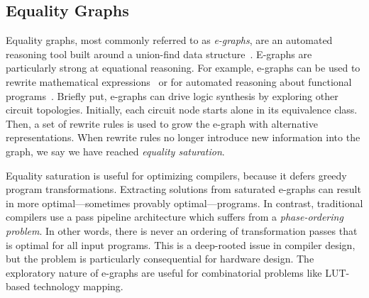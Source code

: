 \subsection{Equality Graphs}\label{sec:background:egraph}
Equality graphs, most commonly referred to as \textit{e-graphs}, are an
automated reasoning tool built around a union-find data
structure~\cite{eggpaper, eqsat}. E-graphs are particularly strong at
equational reasoning. For example, e-graphs can be used to rewrite mathematical
expressions~\cite{egraphmath} or for automated reasoning about functional
programs~\cite{cclemma}. Briefly put, e-graphs can drive logic synthesis by
exploring other circuit topologies. Initially, each circuit node starts alone
in its equivalence class. Then, a set of rewrite rules is used to grow the
e-graph with alternative representations. When rewrite rules no longer
introduce new information into the graph, we say we have reached
\textit{equality saturation}.

Equality saturation is useful for optimizing compilers, because it defers
greedy program transformations. Extracting solutions from saturated e-graphs
can result in more optimal---sometimes provably optimal---programs. In
contrast, traditional compilers use a pass pipeline architecture which suffers
from a \textit{phase-ordering problem}. In other words, there is never an
ordering of transformation passes that is optimal for all input programs. This
is a deep-rooted issue in compiler design, but the problem is particularly
consequential for hardware design. The exploratory nature of e-graphs are
useful for combinatorial problems like LUT-based technology mapping.
